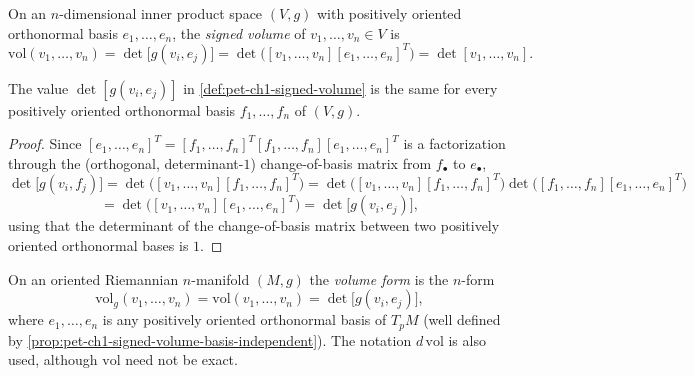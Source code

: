 \begin{definition}
  \label{def:pet-ch1-signed-volume}
  \leanok
  On an $n$-dimensional inner product space $(V,g)$ with positively oriented
  orthonormal basis $e_1,\dots,e_n$, the \emph{signed volume} of $v_1,\dots,v_n\in V$
  is
  \[
    \mathrm{vol}(v_1,\dots,v_n)=\det\big[g(v_i,e_j)\big]
    =\det\big([v_1,\dots,v_n][e_1,\dots,e_n]^T\big)=\det[v_1,\dots,v_n].
  \]
\end{definition}

\begin{proposition}
  \label{prop:pet-ch1-signed-volume-basis-independent}
  \leanok
  The value $\det[g(v_i,e_j)]$ in \cref{def:pet-ch1-signed-volume} is the same for
  every positively oriented orthonormal basis $f_1,\dots,f_n$ of $(V,g)$.
\end{proposition}
\begin{proof}
  \leanok
  Since $[e_1,\dots,e_n]^T=[f_1,\dots,f_n]^T[f_1,\dots,f_n][e_1,\dots,e_n]^T$ is a
  factorization through the (orthogonal, determinant-$1$) change-of-basis matrix
  from $f_\bullet$ to $e_\bullet$,
  \[
    \det\big[g(v_i,f_j)\big]
    =\det\big([v_1,\dots,v_n][f_1,\dots,f_n]^T\big)
    =\det\big([v_1,\dots,v_n][f_1,\dots,f_n]^T\big)\det\big([f_1,\dots,f_n][e_1,\dots,e_n]^T\big)
  \]
  \[
    =\det\big([v_1,\dots,v_n][e_1,\dots,e_n]^T\big)=\det\big[g(v_i,e_j)\big],
  \]
  using that the determinant of the change-of-basis matrix between two positively
  oriented orthonormal bases is $1$.
\end{proof}

\begin{definition}
  \label{def:pet-ch1-volume-form-oriented}
  \leanok
  On an oriented Riemannian $n$-manifold $(M,g)$ the \emph{volume form} is the
  $n$-form
  \[
    \mathrm{vol}_g(v_1,\dots,v_n)=\mathrm{vol}(v_1,\dots,v_n)=\det\big[g(v_i,e_j)\big],
  \]
  where $e_1,\dots,e_n$ is any positively oriented orthonormal basis of
  $T_pM$ (well defined by \cref{prop:pet-ch1-signed-volume-basis-independent}).
  The notation $d\,\mathrm{vol}$ is also used, although $\mathrm{vol}$ need not be exact.
\end{definition}

